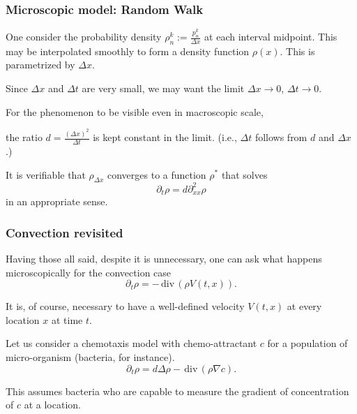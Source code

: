 \documentclass{beamer}
\def\red{\color{red}}
\def\blue{\color{blue}}
\def\div{\,\textrm{div}\,}
\begin{document}
\begin{frame}
 \frametitle{Microscopic model: Random Walk}



    One consider the {\blue probability density} $\rho^k_n:= \frac{p^k_n}{\Delta x}$ at each interval midpoint. This may be interpolated smoothly to form a density function $\rho(x)$. This is parametrized by $\Delta x$. \pause
    
    Since $\Delta x$ and $\Delta t$ are {\red very small}, we may want the limit $\Delta x \rightarrow 0$, $\Delta t \rightarrow 0$.
    
    For the phenomenon to be visible even in {\blue macroscopic scale}, 
    
    the ratio $d = \frac{(\Delta x)^2}{\Delta t}$ is kept constant in the limit. (i.e., $\Delta t$ follows from $d$ and $\Delta x$.)
    
    \vfill
    
    It is verifiable that {\red $\rho_{\Delta x}$ converges to a function $\rho^*$} that solves
    $$\partial_t \rho = d \partial^2_{xx}\rho$$
    in an appropriate sense.
\end{frame}


\begin{frame}
 \frametitle{Convection revisited}

 Having those all said, despite it is unnecessary, one can ask what happens microscopically for the convection case
 \vspace{-1em}
 $$ \partial_t \rho = - \div (\rho V(t,x)).$$
 
  \vspace{-1em}
 It is, of course, necessary to have a well-defined velocity $V(t,x)$ at every location $x$ at time $t$. \pause
 
 Let us consider a chemotaxis model with chemo-attractant $c$ for a population of micro-organism (bacteria, for instance).
  \vspace{-1em}
 $$ \partial_t \rho = d\Delta \rho - \div (\rho \nabla c).$$
 
 \vspace{-1em}
 This assumes bacteria who are capable to measure the {\blue gradient of concentration of $c$} at a location.
\end{frame}
\end{document}
